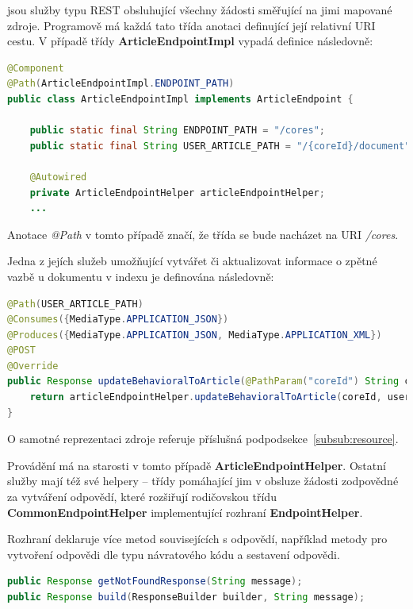 \documentclass[thesis=M,czech]{FITthesis}[2014/05/07]
\begin{document}
jsou služby typu REST obsluhující všechny žádosti směřující na jimi mapované zdroje. Programově má každá tato třída anotaci definující její relativní URI cestu. V případě třídy \textbf{ArticleEndpointImpl} vypadá definice následovně:

\begin{lstlisting}[language=java]
@Component
@Path(ArticleEndpointImpl.ENDPOINT_PATH)
public class ArticleEndpointImpl implements ArticleEndpoint {
    
    public static final String ENDPOINT_PATH = "/cores";
    public static final String USER_ARTICLE_PATH = "/{coreId}/document";

    @Autowired
    private ArticleEndpointHelper articleEndpointHelper;  	
    ...
\end{lstlisting}

Anotace \emph{@Path} v tomto případě značí, že třída se bude nacházet na URI \emph{/cores}.

Jedna z jejích služeb umožňující vytvářet či aktualizovat informace o zpětné vazbě u dokumentu v indexu je definována následovně:

\begin{lstlisting}[language=java]
@Path(USER_ARTICLE_PATH)
@Consumes({MediaType.APPLICATION_JSON})
@Produces({MediaType.APPLICATION_JSON, MediaType.APPLICATION_XML})
@POST
@Override
public Response updateBehavioralToArticle(@PathParam("coreId") String coreId, UserArticleDocument userArticle) {
    return articleEndpointHelper.updateBehavioralToArticle(coreId, userArticle);
} 
\end{lstlisting}

O samotné reprezentaci zdroje referuje příslušná podpodsekce~\ref{subsub:resource}.

Provádění má na starosti v tomto případě \textbf{ArticleEndpointHelper}. Ostatní služby mají též své helpery – třídy pomáhající jim v obsluze žádosti zodpovědné za vytváření odpovědí, které rozšiřují rodičovskou třídu \textbf{CommonEndpointHelper} implementující rozhraní \textbf{EndpointHelper}.

Rozhraní deklaruje více metod souvisejících s odpovědí, například metody pro vytvoření odpovědi dle typu návratového kódu a sestavení odpovědi.

\begin{lstlisting}[language=java]
public Response getNotFoundResponse(String message);
public Response build(ResponseBuilder builder, String message);
\end{lstlisting}
\end{document}
